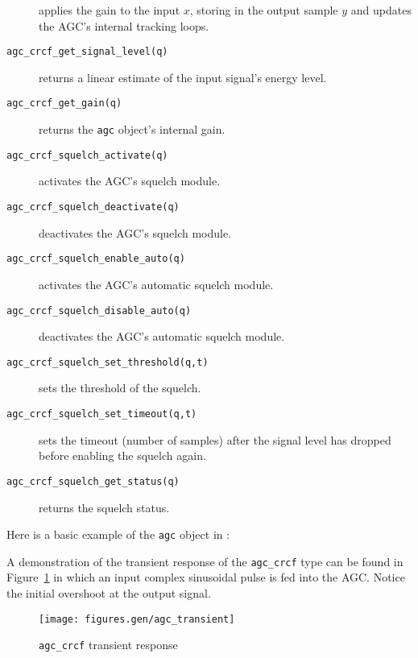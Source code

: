 \begin{description}
    applies the gain to the input $x$, storing in the output sample $y$ and
    updates the AGC's internal tracking loops.
\item[{\tt agc\_crcf\_get\_signal\_level(q)}]
    returns a linear estimate of the input signal's energy level.
\item[{\tt agc\_crcf\_get\_gain(q)}]
    returns the {\tt agc} object's internal gain.
\item[{\tt agc\_crcf\_squelch\_activate(q)}]
    activates the AGC's squelch module.
\item[{\tt agc\_crcf\_squelch\_deactivate(q)}]
    deactivates the AGC's squelch module.
\item[{\tt agc\_crcf\_squelch\_enable\_auto(q)}]
    activates the AGC's automatic squelch module.
\item[{\tt agc\_crcf\_squelch\_disable\_auto(q)}]
    deactivates the AGC's automatic squelch module.
\item[{\tt agc\_crcf\_squelch\_set\_threshold(q,t)}]
    sets the threshold of the squelch.
\item[{\tt agc\_crcf\_squelch\_set\_timeout(q,t)}]
    sets the timeout (number of samples) after the signal level has dropped
    before enabling the squelch again.
\item[{\tt agc\_crcf\_squelch\_get\_status(q)}]
    returns the squelch status.
\end{description}

Here is a basic example of the {\tt agc} object in \liquid:


A demonstration of the transient response of the {\tt agc\_crcf} type can be
found in Figure~\ref{fig:module:agc:transient} in which an input complex
sinusoidal pulse is fed into the AGC.
Notice the initial overshoot at the output signal.%
\begin{figure}
\centering
  \texttt{[image: figures.gen/agc\_transient]}
\caption{{\tt agc\_crcf} transient response}
\label{fig:module:agc:transient}
\end{figure}


